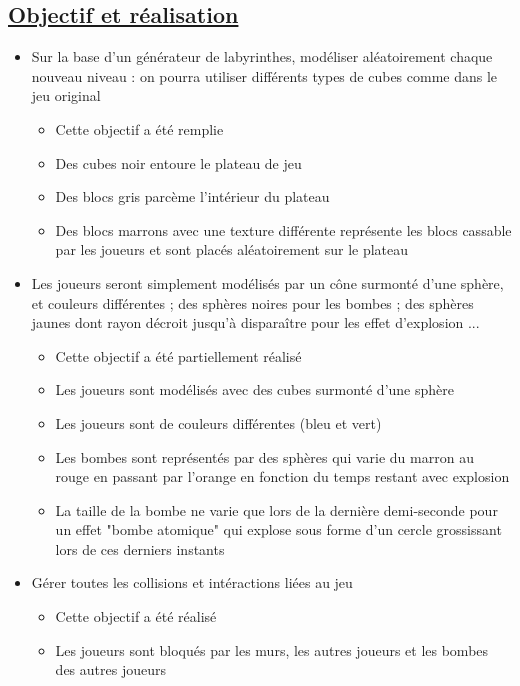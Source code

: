 \documentclass{article}
\begin{document}
    \subsection[Objectif et réalisation]{\href{https://expreg.org/amsi/C/APG2122S1/supports/projets.pdf}{Objectif et réalisation}}
    \begin{itemize}
        \item Sur la base d’un générateur de labyrinthes, modéliser aléatoirement chaque nouveau niveau : on pourra utiliser différents types de cubes
        comme dans le jeu original
        \begin{itemize}
            \item Cette objectif a été remplie
            \item Des cubes noir entoure le plateau de jeu
            \item Des blocs gris parcème l'intérieur du plateau
            \item Des blocs marrons avec une texture différente représente les blocs cassable par les joueurs et sont placés aléatoirement sur le plateau
        \end{itemize}

        \item Les joueurs seront simplement modélisés par un cône surmonté d’une sphère, et couleurs différentes ; des sphères noires pour les bombes ; des sphères jaunes dont rayon décroit jusqu’à disparaître pour les effet d’explosion ...
        \begin{itemize}
            \item Cette objectif a été partiellement réalisé
            \item Les joueurs sont modélisés avec des cubes surmonté d'une sphère
            \item Les joueurs sont de couleurs différentes (bleu et vert)
            \item Les bombes sont représentés par des sphères qui varie du marron au rouge en passant par l'orange en fonction du temps restant avec explosion
            \item La taille de la bombe ne varie que lors de la dernière demi-seconde pour un effet "bombe atomique" qui explose sous forme d'un cercle grossissant lors de ces derniers instants
        \end{itemize}

        \item Gérer toutes les collisions et intéractions liées au jeu
        \begin{itemize}
            \item Cette objectif a été réalisé
            \item Les joueurs sont bloqués par les murs, les autres joueurs et les bombes des autres joueurs
        \end{itemize}


\end{itemize}
\end{document}
